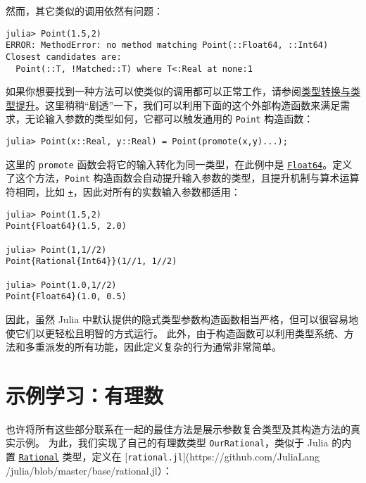 然而，其它类似的调用依然有问题：




\begin{verbatim}
julia> Point(1.5,2)
ERROR: MethodError: no method matching Point(::Float64, ::Int64)
Closest candidates are:
  Point(::T, !Matched::T) where T<:Real at none:1
\end{verbatim}



如果你想要找到一种方法可以使类似的调用都可以正常工作，请参阅\hyperlink{10374023657104680331}{类型转换与类型提升}。这里稍稍“剧透”一下，我们可以利用下面的这个外部构造函数来满足需求，无论输入参数的类型如何，它都可以触发通用的 \texttt{Point} 构造函数：




\begin{verbatim}
julia> Point(x::Real, y::Real) = Point(promote(x,y)...);
\end{verbatim}



这里的 \texttt{promote} 函数会将它的输入转化为同一类型，在此例中是 \hyperlink{5027751419500983000}{\texttt{Float64}}。定义了这个方法，\texttt{Point} 构造函数会自动提升输入参数的类型，且提升机制与算术运算符相同，比如 \hyperlink{3677358729494553841}{\texttt{+}}，因此对所有的实数输入参数都适用：




\begin{verbatim}
julia> Point(1.5,2)
Point{Float64}(1.5, 2.0)

julia> Point(1,1//2)
Point{Rational{Int64}}(1//1, 1//2)

julia> Point(1.0,1//2)
Point{Float64}(1.0, 0.5)
\end{verbatim}



因此，虽然 Julia 中默认提供的隐式类型参数构造函数相当严格，但可以很容易地使它们以更轻松且明智的方式运行。 此外，由于构造函数可以利用类型系统、方法和多重派发的所有功能，因此定义复杂的行为通常非常简单。



\hypertarget{16487801695295609688}{}


\section{示例学习：有理数}



也许将所有这些部分联系在一起的最佳方法是展示参数复合类型及其构造方法的真实示例。 为此，我们实现了自己的有理数类型 \texttt{OurRational}，类似于 Julia 的内置 \hyperlink{8304566144531167610}{\texttt{Rational}} 类型，定义在 [\texttt{rational.jl}](https://github.com/JuliaLang /julia/blob/master/base/rational.jl）：




